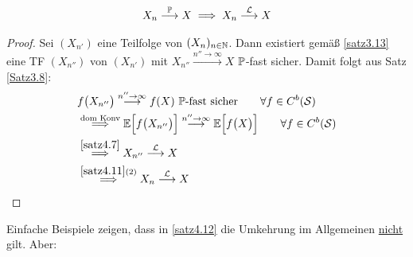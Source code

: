\begin{satz}\label{satz4.12}
\begin{align*}
X_n\stackrel{\P}{\longrightarrow} X\implies X_n\stackrel{\L}{\longrightarrow} X
\end{align*}
\end{satz}
\begin{proof}
Sei $(X_{n'})$ eine Teilfolge von $(X_n)_{n\in\N}$. Dann existiert gemäß \ref{satz3.13} eine TF $(X_{n''})$ von $(X_{n'})$ mit $X_{n''}\stackrel{n''\to\infty}{\longrightarrow} X$ $\P$-fast sicher.
Damit folgt aus Satz \ref{Satz3.8}:
\begin{align*}
&f\big(X_{n''}\big)\stackrel{n''\to\infty}{\longrightarrow}f(X)~\P\text{-fast sicher}\qquad\forall f\in C^b(\S)\\
&\stackrel{\text{dom Konv}}{\implies}
\E\Big[f\big(X_{n''}\big)\Big]\stackrel{n''\to\infty}{\longrightarrow}\E\Big[f\big(X\big)\Big]\qquad\forall f\in C^b(\S)\\
&\stackrel{\ref{satz4.7}}{\implies}
X_{n''}\stackrel{\L}{\longrightarrow} X\\
&\stackrel{\ref{satz4.11}(2)}{\implies}
X_n\stackrel{\L}{\longrightarrow} X
\end{align*}
\end{proof}
Einfache Beispiele zeigen, dass in \ref{satz4.12} die Umkehrung im Allgemeinen \underline{nicht} gilt. Aber:

